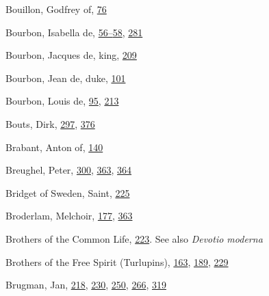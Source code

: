 Bouillon, Godfrey of,
\protect\hyperlink{10_Chapter_Three__THE_HEROIC_DREAM.xhtmlux5cux23page_76}{76}

Bourbon, Isabella de,
\protect\hyperlink{09_Chapter_Two__THE_CRAVING_FOR_A_M.xhtmlux5cux23page_56}{56--}\protect\hyperlink{09_Chapter_Two__THE_CRAVING_FOR_A_M.xhtmlux5cux23page_58}{58},
\protect\hyperlink{18_Chapter_Eleven__THE_FORMS_OF_THO.xhtmlux5cux23page_281}{281}

Bourbon, Jacques de, king,
\protect\hyperlink{14_Chapter_Seven__THE_PIOUS_PERSONA.xhtmlux5cux23page_209}{209}

Bourbon, Jean de, duke,
\protect\hyperlink{10_Chapter_Three__THE_HEROIC_DREAM.xhtmlux5cux23page_101}{101}

Bourbon, Louis de,
\protect\hyperlink{10_Chapter_Three__THE_HEROIC_DREAM.xhtmlux5cux23page_95}{95},
\protect\hyperlink{14_Chapter_Seven__THE_PIOUS_PERSONA.xhtmlux5cux23page_213}{213}

Bouts, Dirk,
\protect\hyperlink{19_Chapter_Twelve__ART_IN_LIFE.xhtmlux5cux23page_297}{297},
\protect\hyperlink{21_Chapter_Thirteen__IMAGE_AND_WORD.xhtmlux5cux23page_376}{376}

\protect\hypertarget{25_INDEX.xhtmlux5cux23page_453}{}{}Brabant, Anton
of,
\protect\hyperlink{11_Chapter_Four__THE_FORMS_OF_LOVE.xhtmlux5cux23page_140}{140}

Breughel, Peter,
\protect\hyperlink{20_ILLUSTRATIONS_FOLLOW_PAGE.xhtmlux5cux23page_300}{300},
\protect\hyperlink{21_Chapter_Thirteen__IMAGE_AND_WORD.xhtmlux5cux23page_363}{363},
\protect\hyperlink{21_Chapter_Thirteen__IMAGE_AND_WORD.xhtmlux5cux23page_364}{364}

Bridget of Sweden, Saint,
\protect\hyperlink{15_Chapter_Eight__RELIGIOUS_EXCITAT.xhtmlux5cux23page_225}{225}

Broderlam, Melchoir,
\protect\hyperlink{13_Chapter_Six__THE_DEPICTION_OF_TH.xhtmlux5cux23page_177}{177},
\protect\hyperlink{21_Chapter_Thirteen__IMAGE_AND_WORD.xhtmlux5cux23page_363}{363}

Brothers of the Common Life,
\protect\hyperlink{15_Chapter_Eight__RELIGIOUS_EXCITAT.xhtmlux5cux23page_223}{223}.
See also \emph{Devotio moderna}

Brothers of the Free Spirit (Turlupins),
\protect\hyperlink{12_Chapter_Five__THE_VISION_OF_DEAT.xhtmlux5cux23page_163}{163},
\protect\hyperlink{13_Chapter_Six__THE_DEPICTION_OF_TH.xhtmlux5cux23page_189}{189},
\protect\hyperlink{15_Chapter_Eight__RELIGIOUS_EXCITAT.xhtmlux5cux23page_229}{229}

Brugman, Jan,
\protect\hyperlink{14_Chapter_Seven__THE_PIOUS_PERSONA.xhtmlux5cux23page_218}{218},
\protect\hyperlink{15_Chapter_Eight__RELIGIOUS_EXCITAT.xhtmlux5cux23page_230}{230},
\protect\hyperlink{17_Chapter_Ten__THE_FAILURE_OF_IMAG.xhtmlux5cux23page_250}{250},
\protect\hyperlink{17_Chapter_Ten__THE_FAILURE_OF_IMAG.xhtmlux5cux23page_266}{266},
\protect\hyperlink{20_ILLUSTRATIONS_FOLLOW_PAGE.xhtmlux5cux23page_319}{319}

